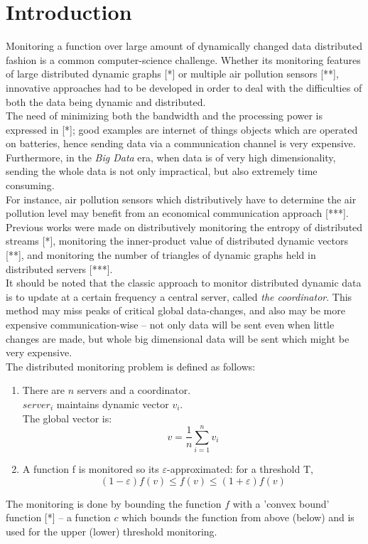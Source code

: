\documentclass[10pt, conference]{IEEEtran}
\begin{document}
\section{Introduction}
Monitoring a function over large amount of dynamically changed data distributed fashion is a common computer-science challenge. Whether its monitoring features of large distributed dynamic graphs [*] or multiple air pollution sensors [**], innovative approaches had to be developed in order to deal with the difficulties of both the data being dynamic and distributed. \\
The need of minimizing both the bandwidth and the processing power is expressed in [*]; good examples are internet of things objects which are operated on batteries, hence sending data via a communication channel is very expensive. Furthermore, in the \textit{Big Data} era, when data is of very high dimensionality, sending the whole data is not only impractical, but also extremely time consuming. \\
For instance, air pollution sensors which distributively have to determine the air pollution level may benefit from an economical communication approach [***]. \\
Previous works were made on distributively monitoring the entropy of distributed streams [*], monitoring the inner-product value of distributed dynamic vectors [**], and monitoring the number of triangles of dynamic graphs held in distributed servers [***]. \\
It should be noted that the classic approach to monitor distributed dynamic data is to update at a certain frequency a central server, called \textit{the coordinator}. This method may miss peaks of critical global data-changes, and also may be more expensive communication-wise -- not only data will be sent even when little changes are made, but whole big dimensional data will be sent which might be very expensive. \\

The distributed monitoring problem is defined as follows:
\begin{enumerate}
\item There are $n$ servers and a coordinator. \\ $server_i$ maintains dynamic vector $v_i$. \\ The global vector is: $$v = \frac{1}{n}\sum\limits_{i=1}^n {v_i}$$
\item A function f is monitored so its $\varepsilon$-approximated: for a threshold T, $$(1-\varepsilon )f(v) \leq f(v) \leq (1+\varepsilon )f(v)$$
\end{enumerate}
The monitoring is done by bounding the function $f$ with a 'convex bound' function [*] -- a function $c$ which bounds the function from above (below) and is used for the upper (lower) threshold monitoring.
\end{document}
